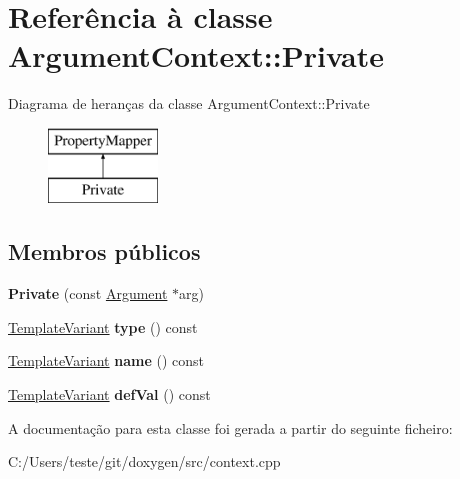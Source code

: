 \hypertarget{class_argument_context_1_1_private}{\section{Referência à classe Argument\-Context\-:\-:Private}
\label{class_argument_context_1_1_private}
}
Diagrama de heranças da classe Argument\-Context\-:\-:Private\begin{figure}[H]
\begin{center}
\leavevmode
\includegraphics[height=2.000000cm]{class_argument_context_1_1_private}
\end{center}
\end{figure}
\subsection*{Membros públicos}
\begin{DoxyCompactItemize}
\item 
\hypertarget{class_argument_context_1_1_private_a2a4335669a3806c40a217b505c79e789}{{\bfseries Private} (const \hyperlink{struct_argument}{Argument} $\ast$arg)}\label{class_argument_context_1_1_private_a2a4335669a3806c40a217b505c79e789}

\item 
\hypertarget{class_argument_context_1_1_private_af7440a1061da61b9cf54139184935f7a}{\hyperlink{class_template_variant}{Template\-Variant} {\bfseries type} () const }\label{class_argument_context_1_1_private_af7440a1061da61b9cf54139184935f7a}

\item 
\hypertarget{class_argument_context_1_1_private_af98912d3b2af14adadc5c221338ec7e9}{\hyperlink{class_template_variant}{Template\-Variant} {\bfseries name} () const }\label{class_argument_context_1_1_private_af98912d3b2af14adadc5c221338ec7e9}

\item 
\hypertarget{class_argument_context_1_1_private_a32ec56b28217168737cd3583db15821b}{\hyperlink{class_template_variant}{Template\-Variant} {\bfseries def\-Val} () const }\label{class_argument_context_1_1_private_a32ec56b28217168737cd3583db15821b}

\end{DoxyCompactItemize}


A documentação para esta classe foi gerada a partir do seguinte ficheiro\-:\begin{DoxyCompactItemize}
\item 
C\-:/\-Users/teste/git/doxygen/src/context.\-cpp\end{DoxyCompactItemize}
